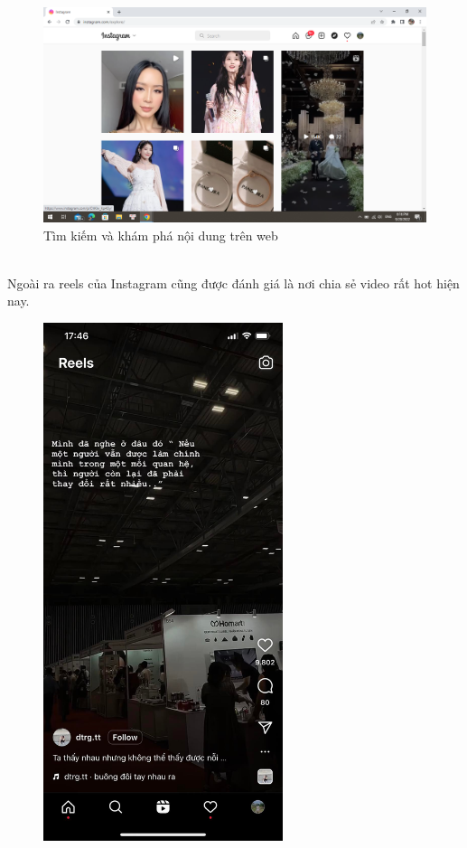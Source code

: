 \begin{itemize}
    \begin{figure}[h!]
        \centering
        \includegraphics[width=13cm]{Images/chapter 2/instagram/search_web.png}
        \caption{Tìm kiếm và khám phá nội dung trên web}
        \label{fig:my_label}
    \end{figure}
\\
\newpage
    Ngoài ra reels của Instagram cũng được đánh giá là nơi chia sẻ video rất hot hiện nay.
    \begin{figure}[h!]
        \centering
        \includegraphics[width=7cm]{Images/chapter 2/instagram/reel_app.jpg}

\end{figure}
\end{itemize}

